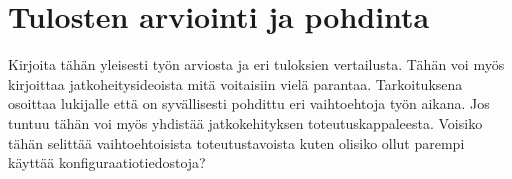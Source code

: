 \chapter{Tulosten arviointi ja pohdinta}
Kirjoita tähän yleisesti työn arviosta ja eri tuloksien vertailusta. Tähän voi myös kirjoittaa jatkoheitysideoista mitä voitaisiin vielä parantaa. Tarkoituksena osoittaa lukijalle että on syvällisesti pohdittu eri vaihtoehtoja työn aikana. Jos tuntuu tähän voi myös yhdistää jatkokehityksen toteutuskappaleesta.
Voisiko tähän selittää vaihtoehtoisista toteutustavoista kuten olisiko ollut parempi käyttää konfiguraatiotiedostoja?